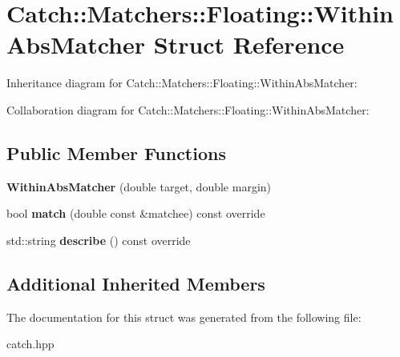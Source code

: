 \hypertarget{structCatch_1_1Matchers_1_1Floating_1_1WithinAbsMatcher}{}\section{Catch\+:\+:Matchers\+:\+:Floating\+:\+:Within\+Abs\+Matcher Struct Reference}
\label{structCatch_1_1Matchers_1_1Floating_1_1WithinAbsMatcher}


Inheritance diagram for Catch\+:\+:Matchers\+:\+:Floating\+:\+:Within\+Abs\+Matcher\+:


Collaboration diagram for Catch\+:\+:Matchers\+:\+:Floating\+:\+:Within\+Abs\+Matcher\+:
\subsection*{Public Member Functions}
\begin{DoxyCompactItemize}
\item 
\mbox{\label{structCatch_1_1Matchers_1_1Floating_1_1WithinAbsMatcher_ac45340b98c41230a7def5bd86c2d870f}} 
{\bfseries Within\+Abs\+Matcher} (double target, double margin)
\item 
\mbox{\label{structCatch_1_1Matchers_1_1Floating_1_1WithinAbsMatcher_afa5d8eed57f12c1e5d006471eb0bfe72}} 
bool {\bfseries match} (double const \&matchee) const override
\item 
\mbox{\label{structCatch_1_1Matchers_1_1Floating_1_1WithinAbsMatcher_a206a738680f8767af31d3f1835afff3f}} 
std\+::string {\bfseries describe} () const override
\end{DoxyCompactItemize}
\subsection*{Additional Inherited Members}


The documentation for this struct was generated from the following file\+:\begin{DoxyCompactItemize}
\item 
catch.\+hpp\end{DoxyCompactItemize}
